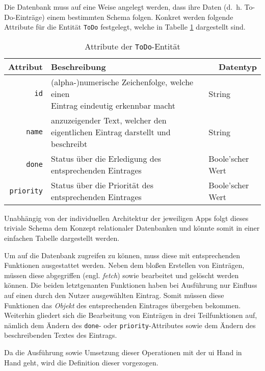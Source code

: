 Die Datenbank muss auf eine Weise angelegt werden, dass ihre Daten (d.\ h. To-Do-Einträge) einem bestimmten Schema folgen. Konkret werden folgende Attribute für die Entität \texttt{ToDo} festgelegt, welche in Tabelle \ref{tab:entity} dargestellt sind.


\usepackage{makecell}

\begin{table}[h!]
\centering
\begin{tabular}{r|l|l}
\textbf{Attribut} & \multicolumn{1}{l|}{\textbf{Beschreibung}} & \multicolumn{1}{r}{\textbf{Datentyp}} \\ \hline
\texttt{id}          & \makecell{(alpha-)numerische Zeichenfolge, welche einen \\ Eintrag eindeutig erkennbar macht}                    & String                                \\
\texttt{name}            & anzuzeigender Text, welcher den eigentlichen Eintrag darstellt und beschreibt                   & String                              \\
\texttt{done}   & Status über die Erledigung des entsprechenden Eintrages                    & Boole'scher Wert \\
\texttt{priority}   & Status über die Priorität des entsprechenden Eintrages                    & Boole'scher Wert \\                                  
\end{tabular}
\caption{Attribute der \texttt{ToDo}-Entität} \label{tab:entity}
\end{table}

Unabhängig von der individuellen Architektur der jeweiligen Apps folgt dieses triviale Schema dem Konzept relationaler Datenbanken und könnte somit in einer einfachen Tabelle dargestellt werden.

Um auf die Datenbank zugreifen zu können, muss diese mit entsprechenden Funktionen ausgestattet werden. Neben dem bloßen Erstellen von Einträgen, müssen diese abgegriffen (engl. \textit{fetch}) sowie bearbeitet und gelöscht werden können. Die beiden letztgenanten Funktionen haben bei Ausführung nur Einfluss auf einen durch den Nutzer ausgewählten Eintrag. Somit müssen diese Funktionen das \textit{Objekt} des entsprechenden Eintrages übergeben bekommen. Weiterhin gliedert sich die Bearbeitung von Einträgen in drei Teilfunktionen auf, nämlich dem Ändern des \texttt{done}- oder \texttt{priority}-Attributes sowie dem Ändern des beschreibenden Textes des Eintrags.

Da die Ausführung sowie Umsetzung dieser Operationen mit der \ac{ui} Hand in Hand geht, wird die Definition dieser vorgezogen.
